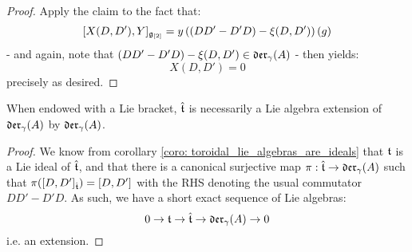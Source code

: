 \begin{proof}
                Apply the claim to the fact that:
                    $$[X(D, D'), Y]_{\mathfrak{g}_{[2]}} = y \left( ( DD' - D'D) - \xi(D, D') \right)( g )$$
                - and again, note that $( DD' - D'D) - \xi(D, D') \in \mathfrak{der}_{\gamma}(A)$ - then yields:
                    $$X(D, D') = 0$$
                precisely as desired. 
            \end{proof}
        \begin{corollary} \label{coro: yangian_extended_toroidal_lie_algebras_are_extensions}
            When endowed with a Lie bracket, $\hat{\mathfrak{t}}$ is necessarily a Lie algebra extension of $\mathfrak{der}_{\gamma}(A)$ by $\mathfrak{der}_{\gamma}(A)$.
        \end{corollary}
            \begin{proof}
                We know from corollary \ref{coro: toroidal_lie_algebras_are_ideals} that $\mathfrak{t}$ is a Lie ideal of $\hat{\mathfrak{t}}$, and that there is a canonical surjective map $\pi: \hat{\mathfrak{t}} \to \mathfrak{der}_{\gamma}(A)$ such that $\pi([D, D']_{\hat{\mathfrak{t}}}) = [D, D']$ with the RHS denoting the usual commutator $DD' - D'D$. As such, we have a short exact sequence of Lie algebras:
                    $$0 \to \mathfrak{t} \to \hat{\mathfrak{t}} \to \mathfrak{der}_{\gamma}(A) \to 0$$
                i.e. an extension.
            \end{proof}

